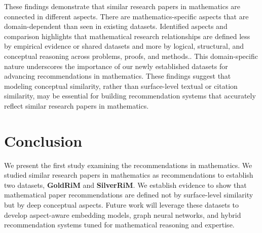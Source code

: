 \documentclass[sigconf,anonymous]{acmart}
\begin{document}
These findings demonstrate that similar research papers in mathematics are connected in different aspects.
There are mathematics-specific aspects that are domain-dependent than seen in existing datasets.
Identified aspects and comparison highlights that mathematical research relationships are defined less by empirical evidence or shared datasets and more by logical, structural, and conceptual reasoning across problems, proofs, and methods..
This domain-specific nature underscores the importance of our newly established datasets for advancing recommendations in mathematics.
These findings suggest that modeling conceptual similarity, rather than surface-level textual or citation similarity, may be essential for building recommendation systems that accurately reflect similar research papers in mathematics.

\section{Conclusion}

We present the first study examining the recommendations in mathematics.
We studied similar research papers in mathematics as recommendations to establish two datasets, \textbf{GoldRiM} and \textbf{SilverRiM}.
We establish evidence to show that mathematical paper recommendations are defined not by surface-level similarity but by deep conceptual aspects.
Future work will leverage these datasets to develop aspect-aware embedding models, graph neural networks, and hybrid recommendation systems tuned for mathematical reasoning and expertise.


\end{document}
